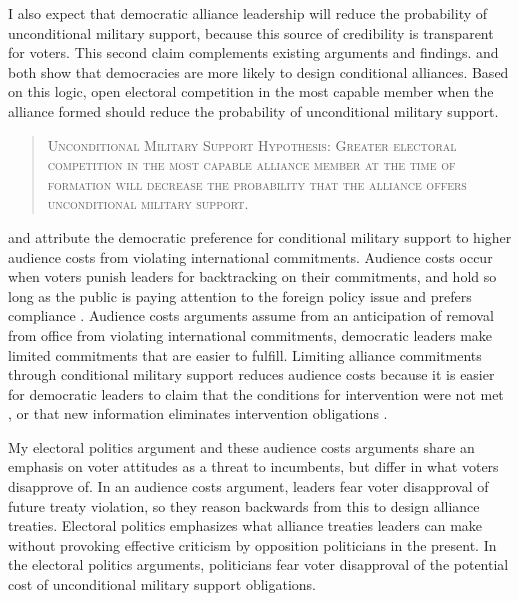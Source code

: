 \documentclass[12pt]{article}
\begin{document}
I also expect that democratic alliance leadership will reduce the probability of unconditional military support, because this source of credibility is transparent for voters. 
This second claim complements existing arguments and findings. 
\citet{Mattes2012} and \citet{Chibaetal2015} both show that democracies are more likely to design conditional alliances. 
Based on this logic, open electoral competition in the most capable member when the alliance formed should reduce the probability of unconditional military support.


\begin{quote}
\textsc{Unconditional Military Support Hypothesis: Greater electoral competition in the most capable alliance member at the time of formation will decrease the probability that the alliance offers unconditional military support.}
\end{quote} 


\citet{Mattes2012} and \citet{Chibaetal2015} attribute the democratic preference for conditional military support to higher audience costs from violating international commitments. 
Audience costs occur when voters punish leaders for backtracking on their commitments, and hold so long as the public is paying attention to the foreign policy issue \citep{Slantchev2006, PotterBaum2014} and prefers compliance \citep{Chaudoin2014, KertzerBrutger2016}.  
Audience costs arguments assume from an anticipation of removal from office from violating international commitments, democratic leaders make limited commitments that are easier to fulfill. 
Limiting alliance commitments through conditional military support reduces audience costs because it is easier for democratic leaders to claim that the conditions for intervention were not met \citep{FjelstulReiter2019}, or that new information eliminates intervention obligations \citep{LevenduskyHorowitz2012}. 


My electoral politics argument and these audience costs arguments share an emphasis on voter attitudes as a threat to incumbents, but differ in what voters disapprove of. 
In an audience costs argument, leaders fear voter disapproval of future treaty violation, so they reason backwards from this to design alliance treaties. 
Electoral politics emphasizes what alliance treaties leaders can make without provoking effective criticism by opposition politicians in the present. 
In the electoral politics arguments, politicians fear voter disapproval of the potential cost of unconditional military support obligations.
     
\end{document}
